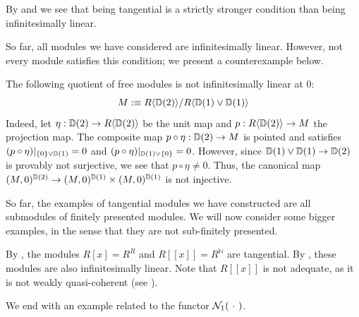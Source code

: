 \begin{remark}
  By  and  we see that being tangential is a strictly stronger condition than being infinitesimally linear.
\end{remark}

So far, all modules we have considered are infinitesimally linear.
However, not every module satisfies this condition; we present a counterexample below.

\begin{counterexample}
  The following quotient of free modules is not infinitesimally linear at $0$:
  \[
    M :\equiv R\langle\mathbb{D}(2)\rangle/R\langle\mathbb{D}(1) \vee \mathbb{D}(1)\rangle
  \]
  Indeed, let $\eta : \mathbb{D}(2) \to R\langle\mathbb{D}(2)\rangle$ be the unit map and $p : R\langle\mathbb{D}(2)\rangle \to M$ the projection map.
  The composite map $p \circ \eta : \mathbb{D}(2) \to M$ is pointed and satisfies $(p \circ \eta)|_{\{0\} \vee \mathbb{D}(1)} = 0$ and $(p \circ \eta)|_{\mathbb{D}(1) \vee \{0\}} = 0$.
  However, since $\mathbb{D}(1) \vee \mathbb{D}(1) \to \mathbb{D}(2)$ is provably not surjective, we see that $p \circ \eta \neq 0$.
  Thus, the canonical map $(M,0)^{\mathbb{D}(2)} \to (M,0)^{\mathbb{D}(1)} \times (M,0)^{\mathbb{D}(1)}$ is not injective.
\end{counterexample}

So far, the examples of tangential modules we have constructed are all submodules of finitely presented modules.
We will now consider some bigger examples, in the sense that they are not sub-finitely presented.

\begin{example}\label{ex:power-series-tangential}
  By , the modules $R[x] = R^R$ and $R[[x]] = R^\mathbb{N}$ are tangential.
  By , these modules are also infinitesimally linear.
  Note that $R[[x]]$ is not adequate, as it is not weakly quasi-coherent (see \cite[Proposition A.0.5]{draft}).
\end{example}

We end with an example related to the functor $\mathcal{N}_{1}(\ \cdot\ )$.

